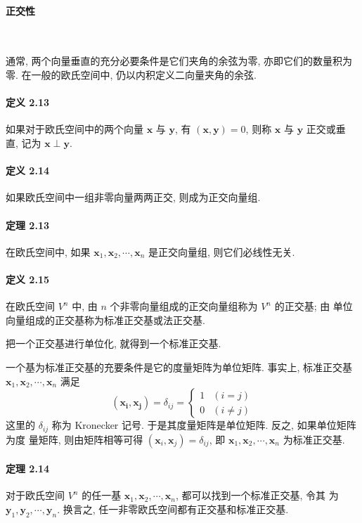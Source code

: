 \paragraph[]{正交性} \

\par 通常, 两个向量垂直的充分必要条件是它们夹角的余弦为零, 亦即它们的数量积为零. 在一般的欧氏空间中, 仍以内积定义二向量夹角的余弦.

\paragraph*{定义 2.13} 如果对于欧氏空间中的两个向量 $\bm{x}$ 与 $\bm{y}$, 有 $(\bm{x}, \bm{y}) = 0$, 则称 $\bm{x}$ 与 $\bm{y}$ 正交或垂
直, 记为 $\bm{x} \perp \bm{y}$.

\paragraph*{定义 2.14} 如果欧氏空间中一组非零向量两两正交, 则成为正交向量组.

\paragraph*{定理 2.13} 在欧氏空间中, 如果 $\bm{x}_1, \bm{x}_2, \cdots, \bm{x}_n$ 是正交向量组, 则它们必线性无关.

\paragraph*{定义 2.15} 在欧氏空间 $V^n$ 中, 由 $n$ 个非零向量组成的正交向量组称为 $V^n$ 的正交基; 由
单位向量组成的正交基称为标准正交基或法正交基.

\par 把一个正交基进行单位化, 就得到一个标准正交基.

\par 一个基为标准正交基的充要条件是它的度量矩阵为单位矩阵. 事实上, 标准正交基
$\bm{x}_1, \bm{x}_2, \cdots, \bm{x}_n$ 满足
$$
    (\bm{x_i}, \bm{x_j}) = \delta_{ij} = \begin{cases}
        1 & (i = j)    \\
        0 & (i \neq j)
    \end{cases}
$$
这里的 $\delta_{ij}$ 称为 Kronecker 记号. 于是其度量矩阵是单位矩阵. 反之, 如果单位矩阵为度
量矩阵, 则由矩阵相等可得 $(\bm{x}_i, \bm{x}_j) = \delta_{ij}$, 即 $\bm{x}_1, \bm{x}_2, \cdots, \bm{x}_n$ 为标准正交基.

\paragraph*{定理 2.14} 对于欧氏空间 $V^n$ 的任一基 $\bm{x}_1, \bm{x}_2, \cdots, \bm{x}_n$, 都可以找到一个标准正交基, 令其
为 $\bm{y}_1, \bm{y}_2, \cdots, \bm{y}_n$. 换言之, 任一非零欧氏空间都有正交基和标准正交基.

